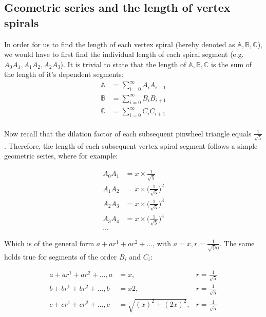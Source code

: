 \subsection{Geometric series and the length of vertex spirals}
In order for us to find the length of each vertex spiral (hereby denoted as $\mathbb{A}, \mathbb{B}, \mathbb{C}$), we would have to first find the individual length of each spiral segment (e.g. $A_{0}A_{1}, A_{1}A_{2}, A_{2}A_{3}$). It is trivial to state that the length of $\mathbb{A}, \mathbb{B}, \mathbb{C}$ is the sum of the length of it's dependent segments:
\begin{equation}
    \begin{aligned}
        \mathbb{A} &= \sum_{i = 0}^{\infty} A_{i}A_{i+1} \\
        \mathbb{B} &= \sum_{i = 0}^{\infty} B_{i}B_{i+1} \\
        \mathbb{C} &= \sum_{i = 0}^{\infty} C_{i}C_{i+1} \\
    \end{aligned}
\end{equation}

\noindent
Now recall that the dilation factor of each subsequent pinwheel triangle equals $\frac{1}{\sqrt{5}}$. Therefore, the length of each subsequent vertex spiral segment follows a simple geometric series, where for example:

\begin{equation}
    \begin{aligned}
        A_{0}A_{1} &= x \times \frac{1}{\sqrt{5}} \\
        A_{1}A_{2} &= x \times \big(\frac{1}{\sqrt{5}}\big)^2 \\
        A_{2}A_{3} &= x \times \big(\frac{1}{\sqrt{5}}\big)^3 \\
        A_{3}A_{4} &= x \times \big(\frac{1}{\sqrt{5}}\big)^4 \\
        \ldots
    \end{aligned}
\end{equation}

\noindent
Which is of the general form $a + ar^1 + ar^2 + \ldots$, with $a = x, r = \frac{1}{\sqrt(5)}$. The same holds true for segments of the order $B_{i}$ and $C_{i}$:

\begin{equation}
    \begin{aligned}
        a + ar^1 + ar^2 + \ldots, a &= x, &r = \frac{1}{\sqrt{5}} \\
        b + br^1 + br^2 + \ldots, b &= x2, &r = \frac{1}{\sqrt{5}} \\
        c + cr^1 + cr^2 + \ldots, c &= \sqrt{(x)^2 + (2x)^2}, &r = \frac{1}{\sqrt{5}} \\
    \end{aligned}
\end{equation}


